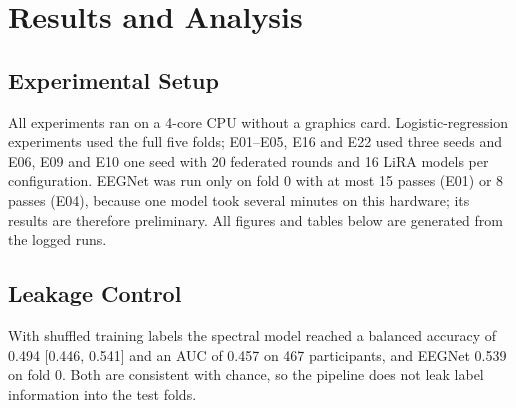 \documentclass[12pt,a4paper,oneside]{report}
\begin{document}
\chapter{Results and Analysis}

\section{Experimental Setup}
All experiments ran on a 4-core CPU without a graphics card. Logistic-regression experiments used the full five folds; E01--E05, E16 and E22 used three seeds and E06, E09 and E10 one seed with 20 federated rounds and 16 LiRA models per configuration. EEGNet was run only on fold 0 with at most 15 passes (E01) or 8 passes (E04), because one model took several minutes on this hardware; its results are therefore preliminary. All figures and tables below are generated from the logged runs.


\section{Leakage Control}
With shuffled training labels the spectral model reached a balanced accuracy of 0.494 [0.446, 0.541] and an AUC of 0.457 on 467 participants, and EEGNet 0.539 on fold 0. Both are consistent with chance, so the pipeline does not leak label information into the test folds.
\end{document}
